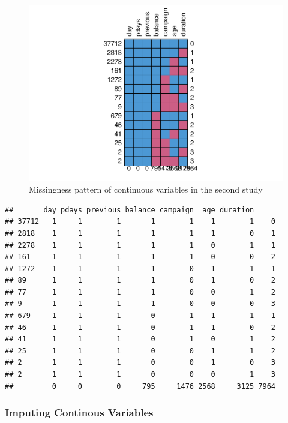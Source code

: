 \documentclass[]{article}
\begin{document}
\begin{figure}
\centering
\includegraphics{Compiled-Technical-Report_files/figure-latex/unnamed-chunk-1-1.pdf}
\caption{Missingness pattern of continuous variables in the second
study}
\end{figure}

\begin{verbatim}
##       day pdays previous balance campaign  age duration     
## 37712   1     1        1       1        1    1        1    0
## 2818    1     1        1       1        1    1        0    1
## 2278    1     1        1       1        1    0        1    1
## 161     1     1        1       1        1    0        0    2
## 1272    1     1        1       1        0    1        1    1
## 89      1     1        1       1        0    1        0    2
## 77      1     1        1       1        0    0        1    2
## 9       1     1        1       1        0    0        0    3
## 679     1     1        1       0        1    1        1    1
## 46      1     1        1       0        1    1        0    2
## 41      1     1        1       0        1    0        1    2
## 25      1     1        1       0        0    1        1    2
## 2       1     1        1       0        0    1        0    3
## 2       1     1        1       0        0    0        1    3
##         0     0        0     795     1476 2568     3125 7964
\end{verbatim}

\hypertarget{imputing-continous-variables}{%
\subsubsection{Imputing Continous
Variables}\label{imputing-continous-variables}}
\end{document}
